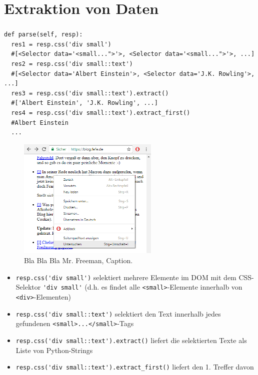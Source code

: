 \documentclass{beamer}
\begin{document}
\section{Extraktion von Daten}
\begin{frame}
	\frametitle{\insertsection{}}
	\begin{lstlisting}[breaklines=true]
def parse(self, resp):
  res1 = resp.css('div small')
  #[<Selector data='<small...">'>, <Selector data='<small...">'>, ...]
  res2 = resp.css('div small::text')
  #[<Selector data='Albert Einstein'>, <Selector data='J.K. Rowling'>, ...]
  res3 = resp.css('div small::text').extract()
  #['Albert Einstein', 'J.K. Rowling', ...]
  res4 = resp.css('div small::text').extract_first()
  #Albert Einstein
  ...
	\end{lstlisting}
	
	\framebreak
	
	
	\begin{figure}{\textwidth}
		\begin{center}
			\includegraphics[width=0.6\textwidth]{texsrc/HTML_inspect_A}
		\end{center}
		\vspace{-10pt}
		\caption{Bla Bla Bla Mr. Freeman, Caption.} 
		\label{fig:HTML_Inspect_selection}
	\end{figure}

	
	
	\framebreak
	
	\begin{itemize}
		\item \lstinline|resp.css('div small')| selektiert mehrere Elemente im DOM
		mit dem CSS-Selektor \lstinline|'div small'| (d.h. es findet alle \lstinline|<small>|-Elemente innerhalb von \lstinline|<div>|-Elementen)
		\item \lstinline|resp.css('div small::text')| selektiert den Text innerhalb jedes gefundenen \lstinline|<small>...</small>|-Tags
		\item \lstinline|resp.css('div small::text').extract()| liefert die selektierten Texte als Liste von Python-Strings
		\item \lstinline|resp.css('div small::text').extract_first()| liefert den 1. Treffer davon
	\end{itemize}
	

\end{frame}
\end{document}

